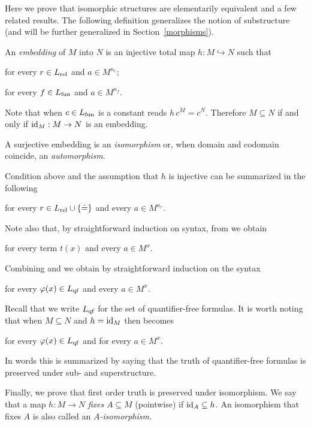 Here we prove that isomorphic structures are elementarily equivalent and a few related results.
The following definition generalizes the notion of substructure (and will be further generalized in Section~\ref{morphisms}).

\begin{definition}\label{isomorfismodef}
An \emph{embedding\/} of $M$ into $N$ is an injective total map $h:M\hookrightarrow N$ such that

\hfill for every $r\in L_{\rm rel}$ and $a\in M^{n_r}$;

\hfill for every $f\in L_{\rm fun}$ and $a\in M^{n_f}$.

Note that when $c\in L_{\rm fun}$ is a constant  reads $h\,c^M=c^N$.
Therefore $M\subseteq N$ if and only if $\id_M:M\imp N$ is an embedding.

A surjective embedding is an \emph{isomorphism} or, when domain and codomain coincide, an \emph{automorphism}.
\end{definition}

Condition  above and the assumption that $h$ is injective can be summarized in the following

\hfill for every $r\in L_{\rm rel}\cup\{\doteq\}$ and every $a\in M^{n_r}$.

Note also that, by straightforward induction on syntax, from  we obtain

\hfill for every term $t(x)$ and every  $a\in M^x$.

Combining  and  we obtain by straightforward induction on the syntax

\hfill for every $\phi(x)\in L_{\rm qf}$ and every $a\in M^x$.

Recall that we write $L_{\rm qf}$ for the set of quantifier-free formulas.
It is worth noting that when $M\subseteq N$ and $h=\id_M$ then  becomes 

\hfill for every $\phi(x)\in L_{\rm qf}$ and for every $a\in M^x$.

In words this is summarized by saying that the truth of quantifier-free formulas is preserved under sub- and superstructure.

Finally, we prove that first order truth is preserved under isomorphism.
We say that a map $h:M\to N$ \emph{fixes\/} $A\subseteq M$ (pointwise) if $\id_A\subseteq h$.
An isomorphism that fixes $A$ is also called an \emph{$A$-isomorphism.}

